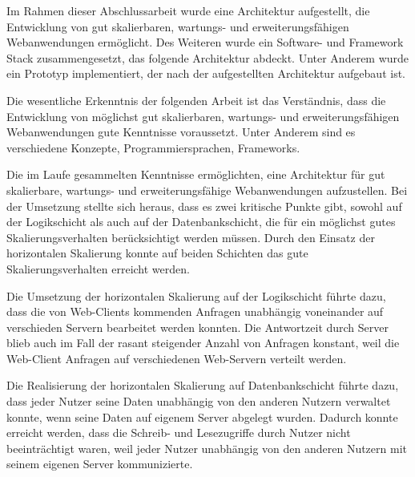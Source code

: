
Im Rahmen dieser Abschlussarbeit wurde eine Architektur aufgestellt, die Entwicklung von gut skalierbaren, wartungs- und erweiterungsfähigen Webanwendungen ermöglicht. Des Weiteren wurde ein Software- und Framework Stack zusammengesetzt, das folgende Architektur abdeckt. Unter Anderem wurde ein Prototyp implementiert, der nach der aufgestellten Architektur aufgebaut ist.


Die wesentliche Erkenntnis der folgenden Arbeit ist das Verständnis, dass die Entwicklung von möglichst gut skalierbaren, wartungs- und erweiterungsfähigen Webanwendungen gute Kenntnisse voraussetzt. Unter Anderem sind es verschiedene Konzepte, Programmiersprachen, Frameworks.

Die im Laufe gesammelten Kenntnisse ermöglichten, eine Architektur für gut skalierbare, wartungs- und erweiterungsfähige Webanwendungen aufzustellen. Bei der Umsetzung stellte sich heraus, dass es zwei kritische Punkte gibt, sowohl auf der Logikschicht als auch auf der Datenbankschicht, die für ein möglichst gutes Skalierungsverhalten berücksichtigt werden müssen.
Durch den Einsatz der horizontalen Skalierung konnte auf beiden Schichten das gute Skalierungsverhalten erreicht werden.

Die Umsetzung der horizontalen Skalierung auf der Logikschicht führte dazu, dass die von Web-Clients kommenden Anfragen unabhängig voneinander auf verschieden Servern bearbeitet werden konnten. Die Antwortzeit durch Server blieb auch im Fall der rasant steigender Anzahl von Anfragen konstant, weil die Web-Client Anfragen auf verschiedenen Web-Servern verteilt werden.

Die Realisierung der horizontalen Skalierung auf Datenbankschicht führte dazu, dass jeder Nutzer seine Daten unabhängig von den anderen Nutzern verwaltet konnte, wenn seine Daten auf eigenem Server abgelegt wurden. Dadurch konnte erreicht werden, dass die Schreib- und Lesezugriffe durch Nutzer nicht beeinträchtigt waren, weil jeder Nutzer unabhängig von den anderen Nutzern mit seinem eigenen Server kommunizierte.




